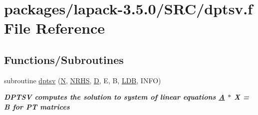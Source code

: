 \hypertarget{dptsv_8f}{}\section{packages/lapack-\/3.5.0/\+S\+R\+C/dptsv.f File Reference}
\label{dptsv_8f}
\subsection*{Functions/\+Subroutines}
\begin{DoxyCompactItemize}
\item 
subroutine \hyperlink{group__doublePTsolve_gaf1bd4c731915bd8755a4da8086fd79a8}{dptsv} (\hyperlink{polmisc_8c_a0240ac851181b84ac374872dc5434ee4}{N}, \hyperlink{example__user_8c_aa0138da002ce2a90360df2f521eb3198}{N\+R\+H\+S}, \hyperlink{odrpack_8h_a7dae6ea403d00f3687f24a874e67d139}{D}, E, B, \hyperlink{example__user_8c_a50e90a7104df172b5a89a06c47fcca04}{L\+D\+B}, I\+N\+F\+O)
\begin{DoxyCompactList}\small\item\em {\bfseries  D\+P\+T\+S\+V computes the solution to system of linear equations \hyperlink{classA}{A} $\ast$ X = B for P\+T matrices} \end{DoxyCompactList}\end{DoxyCompactItemize}
